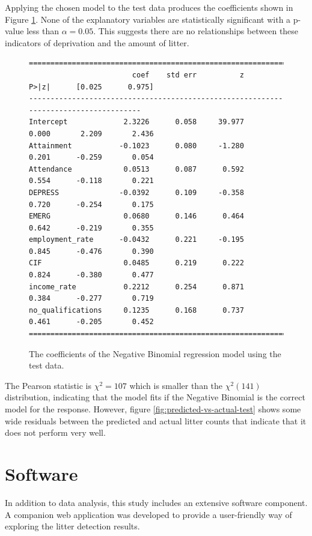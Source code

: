\documentclass{thesis}
\begin{document}
Applying the chosen model to the test data produces the coefficients shown in Figure \ref{fig:nb-coeff-test}. None of the explanatory variables are statistically significant with a p-value less than $\alpha = 0.05$. This suggests there are no relationships between these indicators of deprivation and the amount of litter.

\begin{figure}[h!]
    \centering
\footnotesize
\begin{verbatim}
=====================================================================================
                        coef    std err          z      P>|z|      [0.025      0.975]
-------------------------------------------------------------------------------------
Intercept             2.3226      0.058     39.977      0.000       2.209       2.436
Attainment           -0.1023      0.080     -1.280      0.201      -0.259       0.054
Attendance            0.0513      0.087      0.592      0.554      -0.118       0.221
DEPRESS              -0.0392      0.109     -0.358      0.720      -0.254       0.175
EMERG                 0.0680      0.146      0.464      0.642      -0.219       0.355
employment_rate      -0.0432      0.221     -0.195      0.845      -0.476       0.390
CIF                   0.0485      0.219      0.222      0.824      -0.380       0.477
income_rate           0.2212      0.254      0.871      0.384      -0.277       0.719
no_qualifications     0.1235      0.168      0.737      0.461      -0.205       0.452
=====================================================================================
\end{verbatim}
\normalsize
    \caption{The coefficients of the Negative Binomial regression model using the test data.}
    \label{fig:nb-coeff-test}
\end{figure}

The Pearson statistic is $\chi^2 = 107$ which is smaller than the $\chi^2(141)$ distribution, indicating that the model fits if the Negative Binomial is the correct model for the response. However, figure \ref{fig:predicted-vs-actual-test} shows some wide residuals between the predicted and actual litter counts that indicate that it does not perform very well.

\chapter{Software}

In addition to data analysis, this study includes an extensive software component. A companion web application was developed to provide a user-friendly way of exploring the litter detection results.
\end{document}
